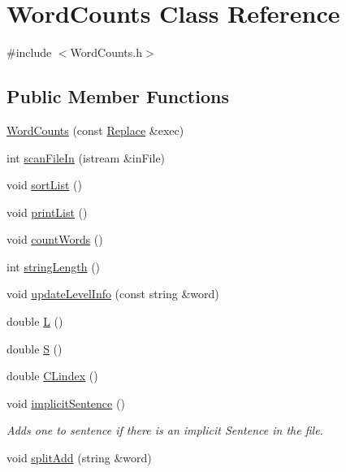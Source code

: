 \hypertarget{class_word_counts}{}\section{Word\+Counts Class Reference}
\label{class_word_counts}


{\ttfamily \#include $<$Word\+Counts.\+h$>$}

\subsection*{Public Member Functions}
\begin{DoxyCompactItemize}
\item 
\hyperlink{class_word_counts_a8dbf0940fa61399ee96c644785ef5c38}{Word\+Counts} (const \hyperlink{class_replace}{Replace} \&exec)
\item 
int \hyperlink{class_word_counts_a235c7c1766ecbe6a4789f6f056752c6c}{scan\+File\+In} (istream \&in\+File)
\item 
void \hyperlink{class_word_counts_a0ad45e9548846c64517e76c2ccccdd05}{sort\+List} ()
\item 
void \hyperlink{class_word_counts_a01636133516c8adb1107e9602654fc6c}{print\+List} ()
\item 
void \hyperlink{class_word_counts_a94b3e97c011259128d23a3a9b8bdcf50}{count\+Words} ()
\item 
int \hyperlink{class_word_counts_aca07106cfd817404552854bbbaccd349}{string\+Length} ()
\item 
void \hyperlink{class_word_counts_a0e3c620a2c6cbdc95b6f15d21af7441e}{update\+Level\+Info} (const string \&word)
\item 
double \hyperlink{class_word_counts_a973557abec8b093a57a048c23b3b35d8}{L} ()
\item 
double \hyperlink{class_word_counts_a25c71e34425387c437d58aceca7167a4}{S} ()
\item 
double \hyperlink{class_word_counts_a1f6b114ff256e99c7222eccff5ddb84c}{C\+Lindex} ()
\item 
void \hyperlink{class_word_counts_a5e4bfc1cdfb59e0243bbd0404b9fc9b0}{implicit\+Sentence} ()
\begin{DoxyCompactList}\small\item\em Adds one to sentence if there is an implicit Sentence in the file. \end{DoxyCompactList}\item 
void \hyperlink{class_word_counts_a16a319c8e6d77cf3c56d5e63fc0b88b3}{split\+Add} (string \&word)

\end{DoxyCompactItemize}
